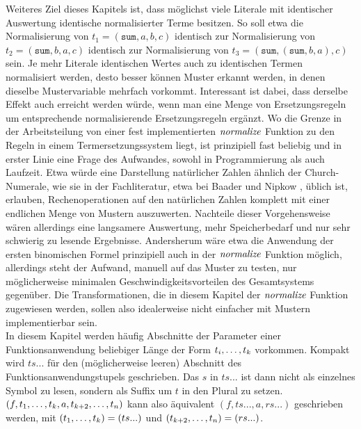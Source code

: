 Weiteres Ziel dieses Kapitels ist, dass möglichst viele Literale mit identischer Auswertung identische normalisierter Terme besitzen. So soll etwa die Normalisierung von $t_1 = (\texttt{sum}, a, b, c)$ identisch zur Normalisierung von $t_2 = (\texttt{sum}, b, a, c)$ identisch zur Normalisierung von $t_3 = (\texttt{sum}, (\texttt{sum}, b, a), c)$ sein. Je mehr Literale identischen Wertes auch zu identischen Termen normalisiert werden, desto besser können Muster erkannt werden, in denen dieselbe Mustervariable mehrfach vorkommt. Interessant ist dabei, dass derselbe Effekt auch erreicht werden würde, wenn man eine Menge von Ersetzungsregeln um entsprechende normalisierende Ersetzungsregeln ergänzt. Wo die Grenze in der Arbeitsteilung von einer fest implementierten $\mathit{normalize}$ Funktion zu den Regeln in einem Termersetzungssystem liegt, ist prinzipiell fast beliebig und in erster Linie eine Frage des Aufwandes, sowohl in Programmierung als auch Laufzeit. Etwa würde eine Darstellung natürlicher Zahlen ähnlich der Church-Numerale, wie sie in der Fachliteratur, etwa bei Baader und Nipkow \cite{baader_nipkow_1998}, üblich ist, erlauben, Rechenoperationen auf den natürlichen Zahlen komplett mit einer endlichen Menge von Mustern auszuwerten. Nachteile dieser Vorgehensweise wären allerdings eine langsamere Auswertung, mehr Speicherbedarf und nur sehr schwierig zu lesende Ergebnisse. Andersherum wäre etwa die Anwendung der ersten binomischen Formel prinzipiell auch in der $\mathit{normalize}$ Funktion möglich, allerdings steht der Aufwand, manuell auf das Muster zu testen, nur möglicherweise minimalen Geschwindigkeitsvorteilen des Gesamtsystems gegenüber. Die Transformationen, die in diesem Kapitel der $\mathit{normalize}$ Funktion zugewiesen werden, sollen also idealerweise nicht einfacher mit Mustern implementierbar sein.\\

In diesem Kapitel werden häufig Abschnitte der Parameter einer Funktionsanwendung beliebiger Länge der Form ${t}_{i}, \dots, {t}_{k}$ vorkommen. Kompakt wird $ts...$ für den (möglicher\-weise leeren) Abschnitt des Funktionsanwendungstupels geschrieben. Das $s$ in $ts...$ ist dann nicht als einzelnes Symbol zu lesen, sondern als Suffix um $t$ in den Plural zu setzen. \\$(f, {t}_{1}, \dots, {t}_{k}, a, {t}_{k+2}, \dots, {t}_{n})$ kann also äquivalent $(f, ts..., a, rs...)$ geschrieben werden, mit $({t}_{1}, \dots, {t}_{k}) = (ts...)$ und $({t}_{k+2}, \dots, {t}_{n}) = (rs...)$.\\

